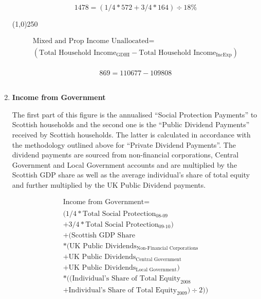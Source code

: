 \begin{enumerate}
\begin{equation} \nonumber
1478 = (1/4*572+3/4*164)\div 18\%
\end{equation}

\begin{center}
\line(1,0){250}
\end{center}


\begin{equation} 
\begin{split}
\text{Mixed and Prop Income Unallocated} = \\ 
(\text{Total Household Income}_\text{GDHI}-\text{Total Household Income}_\text{IncExp})\\
\end{split} \label{eq:2.5.7}
\end{equation} 

\begin{equation} \nonumber
869 = 110677-109808
\end{equation}\\

\item \textbf {Income from Government}

The first part of this figure is the annualised “Social Protection Payments” to Scottish households and the second one is the “Public Dividend Payments” received by Scottish households. The latter is calculated in accordance with the methodology outlined above for “Private Dividend Payments”. The dividend payments are sourced from non-financial corporations, Central Government and Local Government accounts and are multiplied by the Scottish GDP share as well as the average individual’s share of total equity and further multiplied by the UK Public Dividend payments.  \cite{ScotGov2013b,ONS2011c}

\begin{equation}
\begin{split}
\text{Income from Government} =  \\ \\
(1/4*\text{Total Social Protection}_\text{08-09}\\
+3/4*\text{Total Social Protection}_\text{09-10})\\
+(\text{Scottish GDP Share} \\
*(\text{UK Public Dividends}_\text{Non-Financial Corporations}\\
+\text{UK Public Dividends}_\text{Central Government}\\
+\text{UK Public Dividends}_\text{Local Government})\\
*((\text{Individual's Share of Total Equity}_\text{2008}\\
+\text{Individual's Share of Total Equity}_\text{2009})\div 2))
\end{split} \label{eq:2.5.8}
\end{equation}



\end{enumerate}
